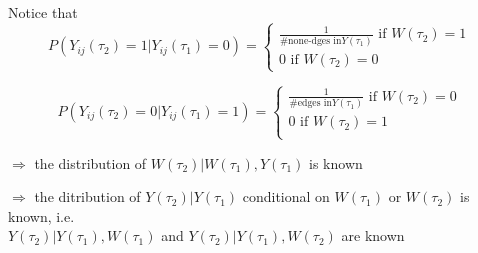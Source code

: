 \documentclass[10pt,letterpaper]{article}
\numberwithin{table}{section}
\numberwithin{figure}{section}
\numberwithin{equation}{section}
\begin{document}
\begin{enumerate}
Notice that 
\begin{equation}
\label{1.11}
P(Y_{ij}(\tau_2) = 1|Y_{ij}(\tau_1) = 0) = 
\begin{cases}
\frac{1}{\# \text{none-dges in}Y(\tau_1)} \text{  if  } W(\tau_2) = 1 \\
0 \text{  if  }  W(\tau_2) = 0 
\end{cases}
\end{equation}

\begin{equation}
\label{1.12}
P(Y_{ij}(\tau_2) = 0|Y_{ij}(\tau_1) = 1) = 
\begin{cases}
\frac{1}{\# \text{edges in}Y(\tau_1)} \text{  if  }  W(\tau_2) = 0 \\
0\text{  if  } W(\tau_2) = 1 \\
\end{cases}
\end{equation}

$\Rightarrow$ the distribution of $W(\tau_2)|W(\tau_1), Y(\tau_1)$ is known

$\Rightarrow$ the ditribution of $Y(\tau_2)|Y(\tau_1)$ conditional on $W(\tau_1)$ or $W(\tau_2)$ is known, i.e.\\
$Y(\tau_2)|Y(\tau_1), W(\tau_1)$ and  $Y(\tau_2)|Y(\tau_1), W(\tau_2)$ are known

\end{enumerate} 
\end{document}
